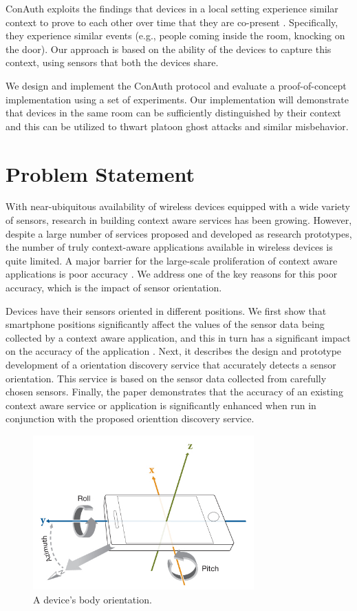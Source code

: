 \documentclass[journal]{IEEEtranTIE}
\begin{document}
ConAuth exploits the findings that devices in a local setting experience similar context
to prove to each other over time that they are co-present \cite{Han}.
Specifically, they experience similar events (e.g., people coming inside the
room, knocking on the door). Our approach is based on the ability of the devices
to capture this context, using sensors that both the devices share.

We design and implement the ConAuth protocol and evaluate a proof-of-concept
implementation using a set of experiments. Our implementation will demonstrate
that devices in the same room can be sufficiently distinguished by their context
and this can be utilized to thwart platoon ghost attacks and similar misbehavior.

\section{Problem Statement}

With near-ubiquitous availability of wireless devices equipped with a wide
variety of sensors, research in building context aware services has been
growing. However, despite a large number of services proposed and developed as
research prototypes, the number of truly context-aware applications available in
wireless devices is quite limited. A major barrier for the large-scale
proliferation of context aware applications is poor accuracy \cite{Alanezi}.
We address one of the key reasons for this poor accuracy, which is the impact of
sensor orientation.

Devices have their sensors oriented in different positions. We first show that
smartphone positions significantly affect the values of the
sensor data being collected by a context aware application, and this in turn
has a significant impact on the accuracy of the application \cite{Alanezi}.
Next, it describes the design and prototype development of a orientation
discovery service that accurately detects a sensor orientation. This service is
based on the sensor data collected from carefully chosen sensors. Finally, the
paper demonstrates that the accuracy of an existing context aware service or
application is significantly enhanced when run in conjunction with the proposed
orienttion discovery service.


\begin{figure}[!t]\centering
	\includegraphics[width=8.5cm]{phoneOrientation}
	\caption{A device's body orientation.}\label{fig:fig1}
\end{figure}
\end{document}
